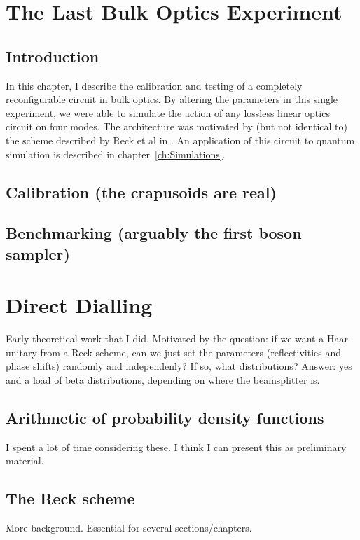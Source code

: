 \documentclass[11pt,a4paper,twoside]{report}
\begin{document}
\chapter{The Last Bulk Optics Experiment}
\label{ch:BulkCircuit}

\section{Introduction}
In this chapter, I describe the calibration and testing of a completely
reconfigurable circuit in bulk optics. By altering the parameters in this single
experiment, we were able to simulate the action of any lossless linear optics
circuit on four modes. The architecture was motivated by (but not identical to)
the scheme described by Reck et al in \cite{reck94}. An application of this
circuit to quantum simulation is described in chapter~\ref{ch:Simulations}.

\section{Calibration (the crapusoids are real)}

\section{Benchmarking (arguably the first boson sampler)}

\chapter{Direct Dialling}
\label{ch:DirectDialling}

Early theoretical work that I did. Motivated by the question: if we want a Haar
unitary from a Reck scheme\cite{reck94}, can we just set the parameters
(reflectivities and phase shifts) randomly and independenly? If so, what
distributions? Answer: yes and a load of beta distributions, depending on where
the beamsplitter is.

\section{Arithmetic of probability density functions}
I spent a lot of time considering these. I think I can present this as
preliminary material.

\section{The Reck scheme}
More background. Essential for several sections/chapters.
\end{document}
